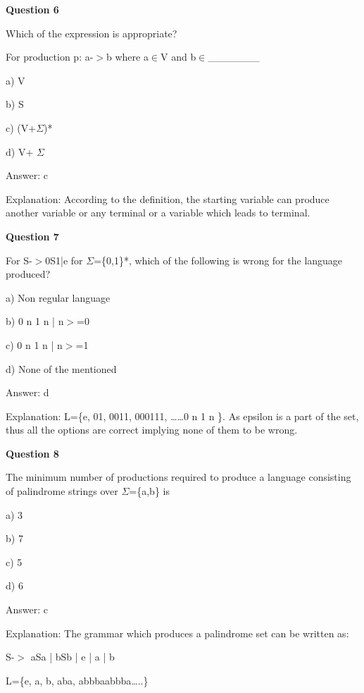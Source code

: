 \documentclass{article}
\begin{document}
\begin{mdframed}[linewidth=1pt, roundcorner=5pt, linecolor=gray!30, backgroundcolor=gray!5]
\textbf{Question 6} 

Which of the expression is appropriate?

For production p: a-$>$b where a$\in$V and b$\in$\_\_\_\_\_\_\_

a) V

b) S

c) (V+$\Sigma$)*

d) V+ $\Sigma$
\vspace{5pt} \par
\begin{tcolorbox}[colback=green!5, colframe=green!40!black, title=Solution]
Answer: c

Explanation: According to the definition, the starting variable can produce another variable or any terminal or a variable which leads to terminal.
\end{tcolorbox}
\end{mdframed}
\newpage

\begin{mdframed}[linewidth=1pt, roundcorner=5pt, linecolor=gray!30, backgroundcolor=gray!5]
\textbf{Question 7} 

For S-$>$0S1|e for $\Sigma$=\{0,1\}*, which of the following is wrong for the language produced?

a) Non regular language

b) 0
n
1
n
 | n$>$=0

c) 0
n
1
n
 | n$>$=1

d) None of the mentioned
\vspace{5pt} \par
\begin{tcolorbox}[colback=green!5, colframe=green!40!black, title=Solution]
Answer: d

Explanation: L=\{e, 01, 0011, 000111, ……0
n
1
n
 \}. As epsilon is a part of the set, thus all the options are correct implying none of them to be wrong.
\end{tcolorbox}
\end{mdframed}

\begin{mdframed}[linewidth=1pt, roundcorner=5pt, linecolor=gray!30, backgroundcolor=gray!5]
\textbf{Question 8} 

The minimum number of productions required to produce a language consisting of palindrome strings over   $\Sigma$=\{a,b\} is

a) 3

b) 7

c) 5

d) 6
\vspace{5pt} \par
\begin{tcolorbox}[colback=green!5, colframe=green!40!black, title=Solution]
Answer: c

Explanation: The grammar which produces a palindrome set can be written as:

S-$>$ aSa | bSb | e | a | b

L=\{e, a, b, aba, abbbaabbba…..\}
\end{tcolorbox}
\end{mdframed}
\end{document}
